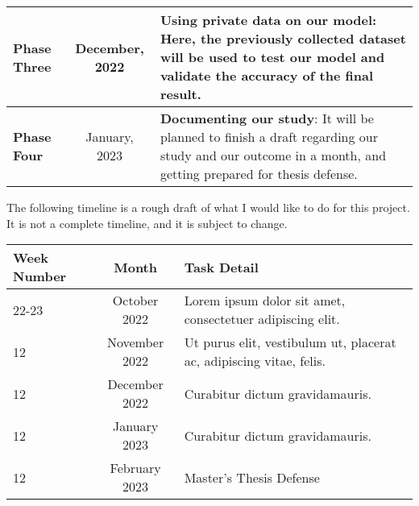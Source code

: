 \begin{tabular}{|l|c|p{9.5cm}|}
    \hline
    \textbf{Phase Three} & December, 2022                                                                      & \textbf{Using private data on our model}: Here, the previously collected dataset will be used to test our model and validate the accuracy of the final result.                                                                                                                                                                                                            \\
    \hline
    \textbf{Phase Four}  & January, 2023                                                                       & \textbf{Documenting our study}: It will be planned to finish a draft regarding our study and our outcome in a month, and getting prepared for thesis defense.                                                                                                                                                                                                             \\
    \hline
\end{tabular}

The following timeline is a rough draft of what I would like to do for this project. It is not a complete timeline, and it is subject to change.

\begin{tabular}{||l|c|p{9.5cm}|}
    \cline{1-3}

    Week Number & Month         & Task Detail                                                         \\
    \hline \hline
    22-23       & October 2022  & Lorem ipsum dolor sit amet, consectetuer adipiscing elit.           \\
    \hline
    12          & November 2022 & Ut purus elit, vestibulum ut, placerat ac, adipiscing vitae, felis. \\
    \hline
    12          & December 2022 & Curabitur dictum gravidamauris.                                     \\
    \hline
    12          & January 2023  & Curabitur dictum gravidamauris.                                     \\ [.3cm]
    \hline
    12          & February 2023 & Master's Thesis Defense                                             \\ [.3cm]
    \cline{1-3}
\end{tabular}
